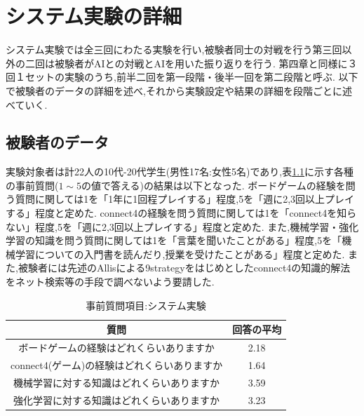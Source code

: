 \chapter{システム実験の詳細}
\label{chap:system}
システム実験では全三回にわたる実験を行い,被験者同士の対戦を行う第三回以外の二回は被験者がAIとの対戦とAIを用いた振り返りを行う.
第四章と同様に３回１セットの実験のうち,前半二回を第一段階・後半一回を第二段階と呼ぶ.
以下で被験者のデータの詳細を述べ,それから実験設定や結果の詳細を段階ごとに述べていく.
\section{被験者のデータ}
実験対象者は計22人の10代-20代学生(男性17名:女性5名)であり,表\ref{table:before}に示す各種の事前質問($1\sim5$の値で答える)の結果は以下となった.
ボードゲームの経験を問う質問に関しては1を「1年に1回程プレイする」程度,5を「週に2,3回以上プレイする」程度と定めた.
connect4の経験を問う質問に関しては1を「connect4を知らない」程度,5を「週に2,3回以上プレイする」程度と定めた.
また,機械学習・強化学習の知識を問う質問に関しては1を「言葉を聞いたことがある」程度,5を「機械学習についての入門書を読んだり,授業を受けたことがある」程度と定めた.
また,被験者には先述のAllis\cite{allis}による9strategyをはじめとしたconnect4の知識的解法をネット検索等の手段で調べないよう要請した.
\begin{table}[H]
    \caption{事前質問項目:システム実験}
    \label{table:before}
	\small
    \begin{tabular}{c||c}
        \multicolumn{1}{c}{質問} & 回答の平均\\ \hline \hline
        ボードゲームの経験はどれくらいありますか & 2.18\\
        connect4(ゲーム)の経験はどれくらいありますか& 1.64\\\hline
        機械学習に対する知識はどれくらいありますか& 3.59\\
        強化学習に対する知識はどれくらいありますか& 3.23\\
    \end{tabular}
    
\end{table}
